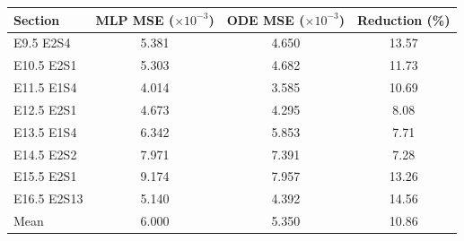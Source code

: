 \begin{tabular}{lccc}
\toprule
Section & MLP MSE ($\times10^{-3}$) & ODE MSE ($\times10^{-3}$) & Reduction (\%) \\
\midrule
E9.5 E2S4 & 5.381 & 4.650 & 13.57 \\
E10.5 E2S1 & 5.303 & 4.682 & 11.73 \\
E11.5 E1S4 & 4.014 & 3.585 & 10.69 \\
E12.5 E2S1 & 4.673 & 4.295 & 8.08 \\
E13.5 E1S4 & 6.342 & 5.853 & 7.71 \\
E14.5 E2S2 & 7.971 & 7.391 & 7.28 \\
E15.5 E2S1 & 9.174 & 7.957 & 13.26 \\
E16.5 E2S13 & 5.140 & 4.392 & 14.56 \\
Mean & 6.000 & 5.350 & 10.86 \\
\bottomrule
\end{tabular}

